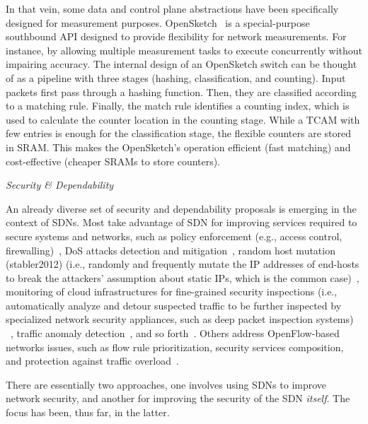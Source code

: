 In that vein, some data and control plane abstractions have been specifically designed for measurement purposes.
OpenSketch~\cite{yu2013-1} is a special-purpose southbound API 
designed to provide flexibility for network measurements.
For instance, by allowing multiple measurement tasks to execute concurrently without impairing accuracy.
The internal design of an OpenSketch switch can be thought of as a pipeline with three stages (hashing, classification, and counting). 
Input packets first pass through a hashing function. 
Then, they are classified according to a matching rule.
Finally, the match rule identifies a counting index, which is used to calculate the counter location in the counting stage. While a TCAM with few 
entries is enough for the classification stage, the flexible counters are stored in SRAM.
This makes the OpenSketch's operation efficient (fast matching) and cost-effective (cheaper SRAMs to store counters).

\vspace{2mm}
\noindent \textit{Security \& Dependability}

An already diverse set of security and dependability proposals is emerging in the context of SDNs.
Most take advantage 
of SDN for improving services required to secure systems and networks, such as policy enforcement (e.g., access 
control, firewalling)~\cite{casado2006,wang2012-1,yao2011,stabler2012}, DoS attacks detection and mitigation~\cite{braga2010-1}, random host mutation (stabler2012) (i.e., randomly and frequently mutate the IP addresses of end-hosts to break the attackers' assumption about static IPs, which is the common case)~\cite{jafarian2012}, monitoring of cloud infrastructures for fine-grained security inspections (i.e., automatically analyze and detour suspected traffic to be  further inspected by specialized network security appliances, such as deep packet inspection systems) ~\cite{shin2012}, traffic anomaly detection~\cite{mehdi2011,braga2010-1}, and so forth~\cite{casado2006,wang2012-1,braga2010-1,jafarian2012,shin2012,stabler2012,yao2011,mehdi2011}.
Others address OpenFlow-based networks issues, such as flow rule prioritization, security 
services composition, and protection against traffic overload~\cite{porras2012,shin2013-1,shin2013-3,wang2013}.

There are essentially two approaches, one involves using SDNs to improve network security, and another for improving the 
security of the SDN \emph{itself}. 
The focus has been, thus far, in the latter.

